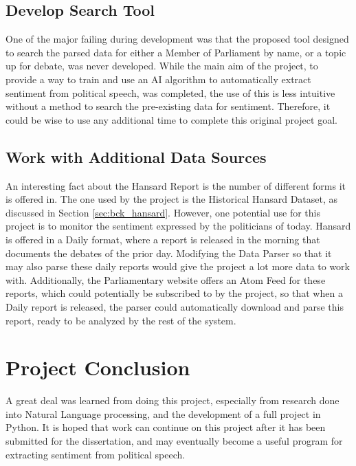 \subsection{Develop Search Tool}

One of the major failing during development was that the proposed tool designed to search the parsed data for either a Member of Parliament by name, or a topic up for debate, was never developed. While the main aim of the project, to provide a way to train and use an AI algorithm to automatically extract sentiment from political speech, was completed, the use of this is less intuitive without a method to search the pre-existing data for sentiment. Therefore, it could be wise to use any additional time to complete this original project goal.

\subsection{Work with Additional Data Sources}

An interesting fact about the Hansard Report is the number of different forms it is offered in. The one used by the project is the Historical Hansard Dataset, as discussed in Section \ref{sec:bck_hansard}. However, one potential use for this project is to monitor the sentiment expressed by the politicians of today. Hansard is offered in a Daily format, where a report is released in the morning that documents the debates of the prior day. Modifying the Data Parser so that it may also parse these daily reports would give the project a lot more data to work with. Additionally, the Parliamentary website offers an Atom Feed for these reports, which could potentially be subscribed to by the project, so that when a Daily report is released, the parser could automatically download and parse this report, ready to be analyzed by the rest of the system.

\section{Project Conclusion}

A great deal was learned from doing this project, especially from research done into Natural Language processing, and the development of a full project in Python. It is hoped that work can continue on this project after it has been submitted for the dissertation, and may eventually become a useful program for extracting sentiment from political speech.
